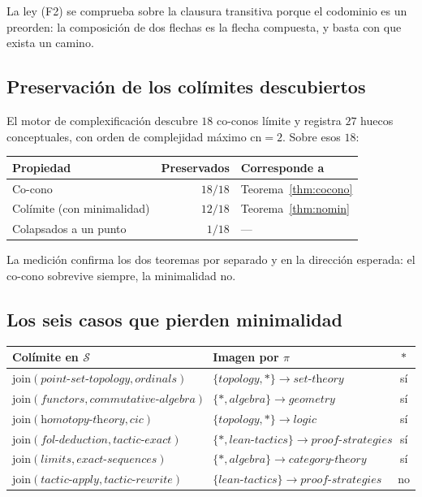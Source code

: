 \documentclass[11pt,a4paper]{article}
\theoremstyle{plain}
\theoremstyle{definition}
\theoremstyle{remark}
\newcommand{\Skills}{\mathcal{S}}
\newcommand{\base}{\ast}
\begin{document}
La ley (F2) se comprueba sobre la clausura transitiva porque el codominio es un
preorden: la composición de dos flechas es la flecha compuesta, y basta con que
exista un camino.

\subsection{Preservación de los colímites descubiertos}

El motor de complexificación descubre $18$ co-conos límite y registra $27$
huecos conceptuales, con orden de complejidad máximo $\mathrm{cn}=2$. Sobre esos
$18$:

\begin{center}
\begin{tabular}{lrl}
\toprule
Propiedad & Preservados & Corresponde a \\
\midrule
Co-cono & $18/18$ & Teorema~\ref{thm:cocono} \\
Colímite (con minimalidad) & $12/18$ & Teorema~\ref{thm:nomin} \\
Colapsados a un punto & $1/18$ & --- \\
\bottomrule
\end{tabular}
\end{center}

La medición confirma los dos teoremas por separado y en la dirección esperada:
el co-cono sobrevive siempre, la minimalidad no.

\subsection{Los seis casos que pierden minimalidad}
\label{sec:base}

\begin{center}
\small
\begin{tabular}{llc}
\toprule
Colímite en $\Skills$ & Imagen por $\pi$ & $\base$ \\
\midrule
$\mathrm{join}(\textit{point-set-topology},\textit{ordinals})$
  & $\{\textit{topology},\base\}\to\textit{set-theory}$ & sí \\
$\mathrm{join}(\textit{functors},\textit{commutative-algebra})$
  & $\{\base,\textit{algebra}\}\to\textit{geometry}$ & sí \\
$\mathrm{join}(\textit{homotopy-theory},\textit{cic})$
  & $\{\textit{topology},\base\}\to\textit{logic}$ & sí \\
$\mathrm{join}(\textit{fol-deduction},\textit{tactic-exact})$
  & $\{\base,\textit{lean-tactics}\}\to\textit{proof-strategies}$ & sí \\
$\mathrm{join}(\textit{limits},\textit{exact-sequences})$
  & $\{\base,\textit{algebra}\}\to\textit{category-theory}$ & sí \\
$\mathrm{join}(\textit{tactic-apply},\textit{tactic-rewrite})$
  & $\{\textit{lean-tactics}\}\to\textit{proof-strategies}$ & no \\
\bottomrule
\end{tabular}
\end{center}
\end{document}
